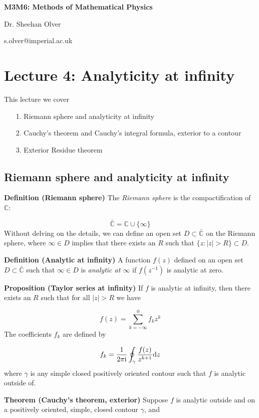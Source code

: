 \documentclass[12pt,a4paper]{article}
\def\D{ {\rm d} }
\def\I{ {\rm i} }
\def\dz{\D z}
\begin{document}
\textbf{M3M6: Methods of Mathematical Physics}

Dr. Sheehan Olver

s.olver@imperial.ac.uk

\section{Lecture 4: Analyticity at infinity}
This lecture we cover

\begin{itemize}
\item[1. ] Riemann sphere and analyticity at infinity


\item[2. ] Cauchy's theorem and Cauchy's integral formula, exterior to a contour


\item[3. ] Exterior Residue theorem 

\end{itemize}
\subsection{Riemann sphere and analyticity at infinity}
\textbf{Definition (Riemann sphere)} The \emph{Riemann sphere} is the compactification of ${\mathbb C}$:

\[
    \bar {\mathbb C} = {\mathbb C} \cup \{\infty\}
\]
Without delving on the details, we can define an open set $D \subset \bar{\mathbb C}$ on the Riemann sphere, where $\infty \in D$ implies that there exists an $R$ such that $\{ z : |z| > R\} \subset D$.

\textbf{Definition (Analytic at infinity)} A function $f(z)$ defined on an open set $D \subset \bar {\mathbb C}$ such that $\infty \in D$ is \emph{analytic at \ensuremath{\infty}} if $f(z^{-1})$ is analytic at zero.

\textbf{Proposition (Taylor series at infinity)} If $f$ is analytic at infinity, then there exists an $R$ such that for all $|z| > R$ we have

\[
f(z) = \sum_{k=-\infty}^0 f_k z^k 
\]
The coefficients $f_k$ are defined by

\[
f_k = {1 \over 2 \pi \I} \oint_\gamma {f(z) \over z^{k+1}} \dz
\]
where $\gamma$ is any simple closed positively oriented contour such that $f$ is analytic outside of.

\textbf{Theorem (Cauchy's theorem, exterior)} Suppose $f$ is analytic outside and on a positively oriented, simple, closed contour $\gamma$, and 
\end{document}
